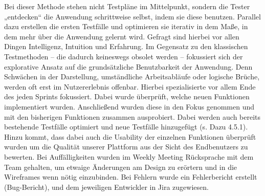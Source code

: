 Bei dieser Methode stehen nicht Testpläne im Mittelpunkt, sondern die Tester „entdecken“ die Anwendung schrittweise selbst, indem sie diese benutzen. Parallel dazu erstellen die ersten Testfälle und optimieren sie iterativ in dem Maße, in dem mehr über die Anwendung gelernt wird. Gefragt sind hierbei vor allen Dingen Intelligenz, Intuition und Erfahrung. Im Gegensatz zu den klassischen Testmethoden – die dadurch keineswegs obsolet werden – fokussiert sich der explorative Ansatz auf die grundsätzliche Benutzbarkeit der Anwendung. Denn Schwächen in der Darstellung, umständliche Arbeitsabläufe oder logische Brüche, werden oft erst im Nutzererlebnis offenbar.
Hierbei spezialisierte vor allem Ende des jeden Sprints fokussiert. Dabei wurde überprüft, welche neuen Funktionen implementiert wurden. Anschließend wurden diese in den Fokus genommen und mit den bisherigen Funktionen zusammen ausprobiert. Dabei werden auch bereits bestehende Testfälle optimiert und neue Testfälle hinzugefügt (s. Dazu 4.5.1). Hinzu kommt, dass dabei auch die Usability der einzelnen Funktionen überprüft wurden um die Qualität unserer Plattform aus der Sicht des Endbenutzers zu bewerten.
Bei Auffälligkeiten wurden im Weekly Meeting Rücksprache mit dem Team gehalten, um etwaige Änderungen am Design zu erörtern und in die Wireframes wenn nötig einzubinden.
Bei Fehlern wurde ein Fehlerbericht erstellt (Bug-Bericht), und dem jeweiligen Entwickler in Jira zugewiesen.